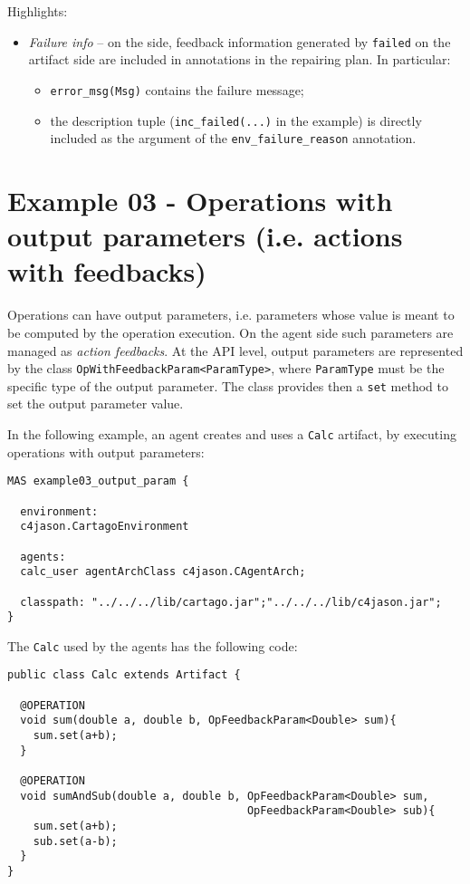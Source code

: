 \documentclass[11pt]{report}
\newcommand\code[1]{{\small{\mbox{\texttt{{#1}}}}}}
\newcommand{\jason}{\mbox{\sf{\emph{{Jason}}}}}
\begin{document}
%
\noindent Highlights:
\begin{itemize}
\item \emph{Failure info} -- on the {\jason} side, feedback information generated by \code{failed} on the artifact side are included in annotations in the repairing plan.
%
In particular:
\begin{itemize}
\item \code{error\_msg(Msg)} contains the failure message;
\item the description tuple  (\code{inc\_failed(...)} in the example) is directly included as the argument of the \code{env\_failure\_reason} annotation.
\end{itemize}
\end{itemize} 


\newpage
\section{Example 03 - Operations with output parameters (i.e. actions with feedbacks)}

Operations can have output parameters,  i.e. parameters whose value is meant to be computed by the operation execution.
%
On the agent side such parameters are managed as \emph{action feedbacks}.
%
At the API level, output parameters are represented by the class \code{OpWithFeedbackParam<ParamType>}, where \code{ParamType} must be the specific type of the output parameter.
%
The class provides then a \code{set} method to set the output parameter value.

%
\noindent In the following example, an agent creates and uses a \code{Calc} artifact, by executing operations with output parameters: 

%
{\small{
\begin{verbatim}
MAS example03_output_param {

  environment: 
  c4jason.CartagoEnvironment

  agents:  
  calc_user agentArchClass c4jason.CAgentArch;

  classpath: "../../../lib/cartago.jar";"../../../lib/c4jason.jar";    
}\end{verbatim}}}
%

\noindent The \code{Calc} used by the agents has the following code:

%
{\small{
\begin{verbatim}
public class Calc extends Artifact {

  @OPERATION 
  void sum(double a, double b, OpFeedbackParam<Double> sum){
    sum.set(a+b);
  }

  @OPERATION 
  void sumAndSub(double a, double b, OpFeedbackParam<Double> sum, 
                                     OpFeedbackParam<Double> sub){
    sum.set(a+b);
    sub.set(a-b);
  }
}\end{verbatim}}}
\end{document}
